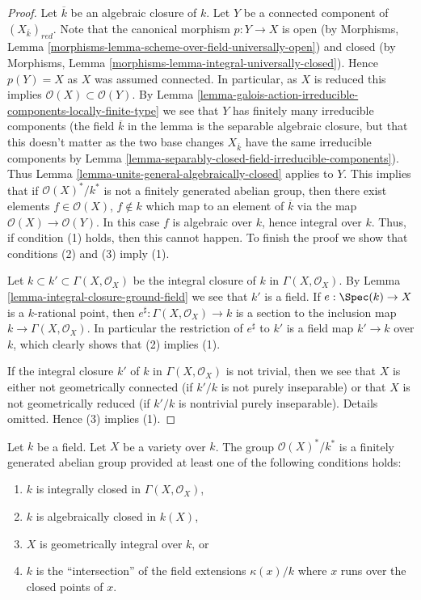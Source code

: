 \begin{proof}
Let $\overline{k}$ be an algebraic closure of $k$.
Let $Y$ be a connected component of $(X_{\overline{k}})_{red}$.
Note that the canonical morphism $p : Y \to X$ is open (by
Morphisms, Lemma \ref{morphisms-lemma-scheme-over-field-universally-open})
and closed (by
Morphisms, Lemma \ref{morphisms-lemma-integral-universally-closed}).
Hence $p(Y) = X$ as $X$ was assumed connected. In particular, as
$X$ is reduced this implies $\mathcal{O}(X) \subset \mathcal{O}(Y)$. By
Lemma \ref{lemma-galois-action-irreducible-components-locally-finite-type}
we see that $Y$ has finitely many irreducible components (the field
$\overline{k}$ in the lemma is the separable algebraic closure, but
that this doesn't matter as the two base changes $X_{\overline{k}}$
have the same irreducible components by
Lemma \ref{lemma-separably-closed-field-irreducible-components}). Thus
Lemma \ref{lemma-units-general-algebraically-closed}
applies to $Y$. This implies that if $\mathcal{O}(X)^*/k^*$ is
not a finitely generated abelian group, then there exist elements
$f \in \mathcal{O}(X)$, $f \not \in k$ which map to an element of
$\overline{k}$ via the map $\mathcal{O}(X) \to \mathcal{O}(Y)$.
In this case $f$ is algebraic over $k$, hence
integral over $k$. Thus, if condition (1) holds, then this cannot happen.
To finish the proof we show that conditions (2) and (3) imply (1).

\medskip\noindent
Let $k \subset k' \subset \Gamma(X, \mathcal{O}_X)$ be the integral
closure of $k$ in $\Gamma(X, \mathcal{O}_X)$. By
Lemma \ref{lemma-integral-closure-ground-field}
we see that $k'$ is a field.
If $e : \Spec(k) \to X$ is a $k$-rational point, then
$e^\sharp : \Gamma(X, \mathcal{O}_X) \to k$ is a section to the
inclusion map $k \to \Gamma(X, \mathcal{O}_X)$. In particular the
restriction of $e^\sharp$ to $k'$ is a field map $k' \to k$ over $k$,
which clearly shows that (2) implies (1).

\medskip\noindent
If the integral closure $k'$ of $k$ in $\Gamma(X, \mathcal{O}_X)$
is not trivial, then we see that $X$ is either not geometrically connected
(if $k'/k$ is not purely inseparable) or that $X$ is not
geometrically reduced (if $k'/k$ is nontrivial purely inseparable).
Details omitted. Hence (3) implies (1).
\end{proof}

\begin{lemma}
\label{lemma-units-variety}
Let $k$ be a field.
Let $X$ be a variety over $k$.
The group $\mathcal{O}(X)^*/k^*$ is a finitely generated abelian group
provided at least one of the following conditions holds:
\begin{enumerate}
\item $k$ is integrally closed in $\Gamma(X, \mathcal{O}_X)$,
\item $k$ is algebraically closed in $k(X)$,
\item $X$ is geometrically integral over $k$, or
\item $k$ is the ``intersection'' of the field extensions
$\kappa(x)/k$ where $x$ runs over the closed points of $x$.
\end{enumerate}
\end{lemma}

